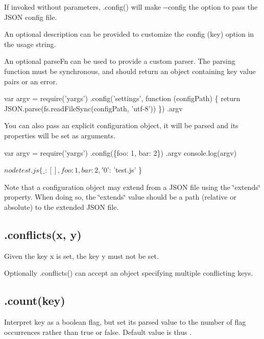 If invoked without parameters, {\ttfamily .config()} will make {\ttfamily -\/-\/config} the option to pass the J\+S\+ON config file.

An optional {\ttfamily description} can be provided to customize the config ({\ttfamily key}) option in the usage string.

An optional {\ttfamily parse\+Fn} can be used to provide a custom parser. The parsing function must be synchronous, and should return an object containing key value pairs or an error.


\begin{DoxyCode}
var argv = require('yargs')
  .config('settings', function (configPath) \{
    return JSON.parse(fs.readFileSync(configPath, 'utf-8'))
  \})
  .argv
\end{DoxyCode}


You can also pass an explicit configuration {\ttfamily object}, it will be parsed and its properties will be set as arguments.


\begin{DoxyCode}
var argv = require('yargs')
  .config(\{foo: 1, bar: 2\})
  .argv
console.log(argv)
\end{DoxyCode}



\begin{DoxyCode}
$ node test.js
\{ \_: [],
  foo: 1,
  bar: 2,
  '$0': 'test.js' \}
\end{DoxyCode}


Note that a configuration object may extend from a J\+S\+ON file using the {\ttfamily \char`\"{}extends\char`\"{}} property. When doing so, the {\ttfamily \char`\"{}extends\char`\"{}} value should be a path (relative or absolute) to the extended J\+S\+ON file.

\subsection*{\label{_conflicts}%
.conflicts(x, y) }

Given the key {\ttfamily x} is set, the key {\ttfamily y} must not be set.

Optionally {\ttfamily .conflicts()} can accept an object specifying multiple conflicting keys.

\subsection*{\label{_count}%
.count(key) }

Interpret {\ttfamily key} as a boolean flag, but set its parsed value to the number of flag occurrences rather than {\ttfamily true} or {\ttfamily false}. Default value is thus {}.

